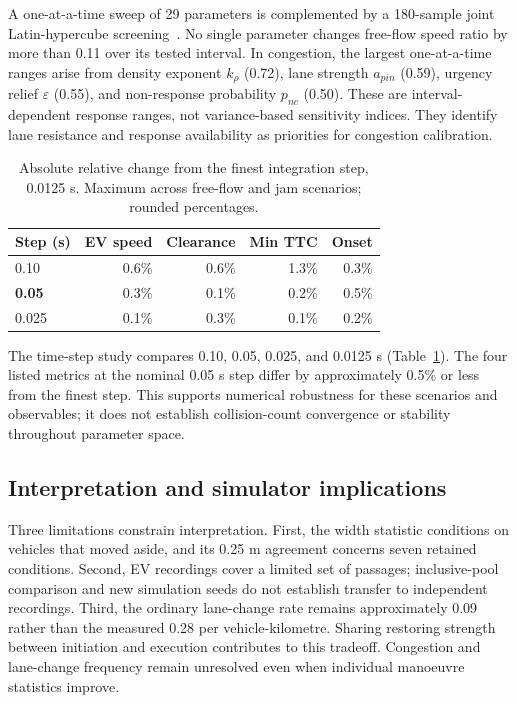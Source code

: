 \documentclass[conference,a4paper]{IEEEtran}
\begin{document}
A one-at-a-time sweep of 29 parameters is complemented by a 180-sample joint Latin-hypercube screening~\cite{mckay79,saltelli08}. No single parameter changes free-flow speed ratio by more than 0.11 over its tested interval. In congestion, the largest one-at-a-time ranges arise from density exponent $k_\rho$ (0.72), lane strength $a_{pin}$ (0.59), urgency relief $\varepsilon$ (0.55), and non-response probability $p_{nc}$ (0.50). These are interval-dependent response ranges, not variance-based sensitivity indices. They identify lane resistance and response availability as priorities for congestion calibration.

\begin{table}[t]
\caption{Absolute relative change from the finest integration step, 0.0125 s. Maximum across free-flow and jam scenarios; rounded percentages.}
\label{tab:convergence}\centering\footnotesize
\begin{tabular}{@{}lrrrr@{}}\toprule
Step (s) & EV speed & Clearance & Min TTC & Onset\\\midrule
0.10 & 0.6\% & 0.6\% & 1.3\% & 0.3\%\\
\textbf{0.05} & 0.3\% & 0.1\% & 0.2\% & 0.5\%\\
0.025 & 0.1\% & 0.3\% & 0.1\% & 0.2\%\\\bottomrule
\end{tabular}
\end{table}

The time-step study compares 0.10, 0.05, 0.025, and 0.0125 s (Table~\ref{tab:convergence}). The four listed metrics at the nominal 0.05 s step differ by approximately 0.5\% or less from the finest step. This supports numerical robustness for these scenarios and observables; it does not establish collision-count convergence or stability throughout parameter space.

\subsection{Interpretation and simulator implications}
Three limitations constrain interpretation. First, the width statistic conditions on vehicles that moved aside, and its 0.25 m agreement concerns seven retained conditions. Second, EV recordings cover a limited set of passages; inclusive-pool comparison and new simulation seeds do not establish transfer to independent recordings. Third, the ordinary lane-change rate remains approximately 0.09 rather than the measured 0.28 per vehicle-kilometre. Sharing restoring strength between initiation and execution contributes to this tradeoff. Congestion and lane-change frequency remain unresolved even when individual manoeuvre statistics improve.
\end{document}
